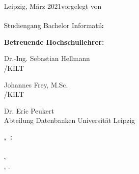 \begin{titlepage}
\begin{center}
		\renewcommand{\arraystretch}{1}
  \end{center}
  
Leipzig, März 2021\hfill vorgelegt von \\[3mm]
\hspace*{\fill} {\large \myfirstname~\mylastname}\\
\hspace*{\fill} Studiengang Bachelor Informatik

\vspace{1cm}

{\large \textbf{Betreuende Hochschullehrer:}}

{\large Dr.-Ing. Sebastian Hellmann }\\
\mycompany/KILT

{\large Johannes Frey, M.Sc. }\\
\mycompany/KILT

{\large Dr. Eric Peukert}\\
Abteilung Datenbanken Universität Leipzig
  
\end{titlepage}

\thispagestyle{empty}
\vspace*{\fill}
\begin{minipage}{.95\textwidth}
\textbf{\mylastname,~\myfirstname:}\\
\emph{\titleOfThesis}\\
\kindOfThesis, \myuni \\
\myplace, \myyear.
\end{minipage}

\cleardoublepage



\setcounter{tocdepth}{2}
\tableofcontents




\cleardoublepage


